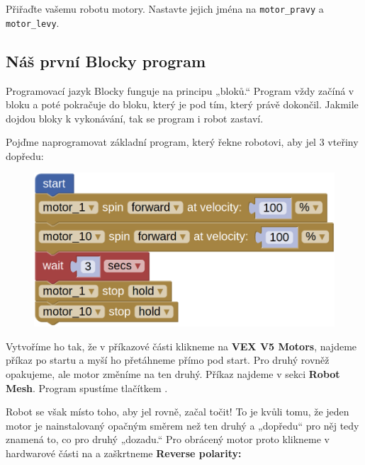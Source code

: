 \documentclass[main.tex]{subfiles}
\begin{document}
	\begin{question}
		Přiřaďte vašemu robotu motory. Nastavte jejich jména na \texttt{motor\_pravy} a \texttt{motor\_levy}.
	\end{question}

	\subsection{Náš první Blocky program}

	Programovací jazyk Blocky funguje na principu „bloků.“ Program vždy začíná v bloku \blockStartImage a poté pokračuje do bloku, který je pod tím, který právě dokončil. Jakmile dojdou bloky k vykonávání, tak se program i robot zastaví.

	Pojďme naprogramovat základní program, který řekne robotovi, aby jel $3$ vteřiny dopředu:

	\begin{figure}[h!]
		\centering
		\begin{minipage}{0.5\textwidth}
			\includegraphics[width=\linewidth]{Images/01/program-1.png}
		\end{minipage}
	\end{figure}

	Vytvoříme ho tak, že v příkazové části klikneme na \textbf{VEX V5 Motors}, najdeme příkaz po startu a myší ho přetáhneme přímo pod start. Pro druhý rovněž opakujeme, ale motor změníme na ten druhý. Příkaz \blockWaitImage najdeme v sekci \textbf{Robot Mesh}. Program spustíme tlačítkem .

	Robot se však místo toho, aby jel rovně, začal točit! To je kvůli tomu, že jeden motor je nainstalovaný opačným směrem než ten druhý a „dopředu“ pro něj tedy znamená to, co pro druhý „dozadu.“ Pro obrácený motor proto klikneme v hardwarové části na  a zaškrtneme \textbf{Reverse polarity:}
\end{document}
